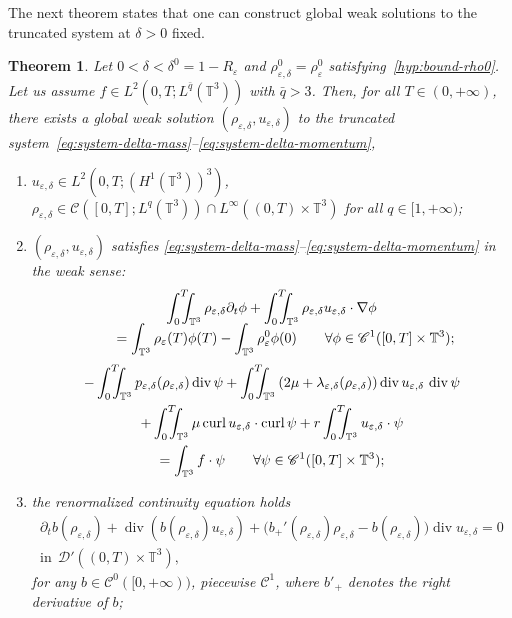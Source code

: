 \documentclass[10pt]{amsart}
\let\mathcal\mathscr
\let\cal\mathcal
\newcommand{\<}{\bigl\langle}
\renewcommand{\>}{\bigr\rangle}
\newcommand{\intTTT}{\int_0^T\hspace*{-2.5mm}\int_{\TT}}
\newcommand{\labeleq}[1]{}
\newtheorem{thm}{Theorem}[section]
\theoremstyle{definition}
\theoremstyle{remark}
\newcommand{\TT}{\mathbb{T}^3}
\DeclareMathOperator{\curl}{curl}
\DeclareMathOperator{\Div}{div}
\let\ep\varepsilon
\begin{document}
The next theorem states that one can construct global weak solutions to the truncated system at $\delta> 0$ fixed.
\begin{thm}\label{approx}
Let $0 < \delta < \delta^0 = 1-R_\ep$ and $\rho_{\ep,\delta}^0 = \rho_\ep^0$ satisfying~\eqref{hyp:bound-rho0}.
Let us assume $f \in L^2(0,T; L^{\bar{q}}(\TT))$ with $\bar{q}>3$.
Then, for all $T \in (0, +\infty)$, there exists a global weak solution $(\rho_{\ep,\delta},u_{\ep,\delta})$ to the truncated system~\eqref{eq:system-delta-mass}--\eqref{eq:system-delta-momentum}, \ie
\begin{enumerate}
\item $u_{\ep,\delta}\in L^2(0,T;(H^1(\TT))^3)$, $\rho_{\ep,\delta} \in \mathcal{C}([0,T];L^q(\TT)) \cap L^\infty((0,T) \times \TT)$ for all $q \in [1, +\infty)$;
\item $(\rho_{\ep,\delta},u_{\ep,\delta})$ satisfies \eqref{eq:system-delta-mass}--\eqref{eq:system-delta-momentum}
in the weak sense:
\begin{multline*}\labeleq{weak-delta-mass}
\intTTT{\rho_{\ep,\delta} \partial_t \phi}
+ \intTTT{\rho_{\ep,\delta} u_{\ep,\delta} \cdot \nabla \phi} \\[-5pt]
\qquad = \int_{\TT}{\rho_\ep(T) \phi(T)} - \int_{\TT}{\rho_\ep^0 \phi(0)}
\qquad \forall \phi \in \mathcal{C}^1([0,T] \times \TT);
\end{multline*} 
\begin{multline}\label{eq:weak-delta-div-mom}
- \intTTT{p_{\ep,\delta}(\rho_{\ep,\delta})\Div \psi}
+ \intTTT{(2\mu+\lambda_{\ep,\delta}(\rho_{\ep,\delta}))
\Div u_{\ep,\delta} \, \Div \psi} \\
+ \intTTT
\mu\curl u_{\ep,\delta} \cdot \curl \psi
+ r\intTTT{u_{\ep,\delta} \cdot \psi}\\
= \int_{\TT}{f \cdot \psi}
\qquad \forall \psi \in \mathcal{C}^1([0,T] \times \TT);
\end{multline} 
\item the \emph{renormalized continuity equation} holds
\begin{multline}\label{eq:renormalized-delta}
\partial_t b(\rho_{\ep,\delta}) + \Div(b(\rho_{\ep,\delta}) u_{\ep,\delta})
+ \big(b_+'(\rho_{\ep,\delta})\rho_{\ep,\delta}
- b(\rho_{\ep,\delta})\big)\Div u_{\ep,\delta} = 0
\\ \text{in}~~\mathcal{D}'((0,T)\times \TT),
\end{multline}
for any $b \in \mathcal{C}^0([0,+\infty))$, piecewise ${\cal C}^1$, where $b'_+$
denotes the right derivative of $b$;


\end{enumerate}
\end{thm}
\end{document}
